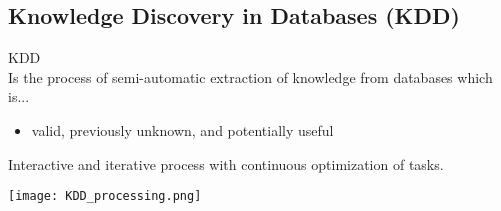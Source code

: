 \subsection{Knowledge Discovery in Databases (KDD)}

\begin{definition}{KDD}\\
Is the process of semi-automatic extraction of knowledge from databases which is...
\begin{itemize}
    \item valid, previously unknown, and potentially useful
\end{itemize}
Interactive and iterative process with continuous optimization of tasks.
\end{definition}

\texttt{[image: KDD\_processing.png]}
